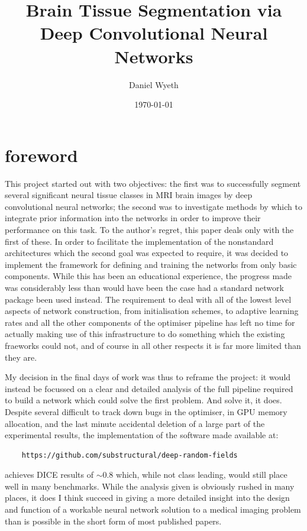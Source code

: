 \documentclass[msc]{infthesis}
\author{Daniel Wyeth}
\date{\today}
\title{Brain Tissue Segmentation via Deep Convolutional Neural Networks}
\begin{document}
\maketitle
\tableofcontents






\section*{foreword}

This project started out with two objectives: the first was to successfully segment several
significant neural tissue classes in MRI brain images by deep convolutional neural networks;
the second was to investigate methods by which to integrate prior information into the networks
in order to improve their performance on this task.  To the author's regret, this paper deals
only with the first of these.  In order to facilitate the implementation of the nonstandard
architectures which the second goal was expected to require, it was decided to implement the
framework for defining and training the networks from only basic components.  While this has
been an educational experience, the progress made was considerably less than would have been
the case had a standard network package been used instead.  The requirement to deal with all
of the lowest level aspects of network construction, from initialisation schemes, to adaptive
learning rates and all the other components of the optimiser pipeline has left no time for
actually making use of this infrastructure to do something which the existing fraeworks could
not, and of course in all other respects it is far more limited than they are.

My decision in the final days of work was thus to reframe the project: it would instead be
focussed on a clear and detailed analysis of the full pipeline required to build a network
which could solve the first problem.  And solve it, it does.  Despite several difficult to
track down bugs in the optimiser, in GPU memory allocation, and the last minute accidental
deletion of a large part of the experimental results, the implementation of the software
made available at:
\begin{verbatim}
    https://github.com/substructural/deep-random-fields
\end{verbatim}
achieves DICE results of \(\sim 0.8\) which, while not class leading, would still place well
in many benchmarks.  While the analysis given is obviously rushed in many places, it does I
think succeed in giving a more detailed insight into the design and function of a workable
neural network solution to a medical imaging problem than is possible in the short form of
most published papers.
\end{document}
